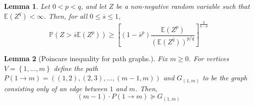 \documentclass{article}
\newcommand{\set}[1]{\left\{#1\right\}}
\newcommand{\1}{\mathbf{1}}
\theoremstyle{alden}
\theoremstyle{aldenthm}
\newtheorem{lemma}{Lemma}
\theoremstyle{definition}
\theoremstyle{remark}
\begin{document}
\begin{lemma}
	\label{lem:paley_zygmund}
	Let $0 < p < q$, and let $Z$ be a non-negative random variable such that $\mathbb{E}(Z^q) < \infty$. Then, for all $0 \leq \overline{s} \leq 1$,
	\begin{equation}
	\label{eqn:paley_zygmund}
	\mathbb{P}(Z > \overline{s} \mathbb{E}(Z^p)) \geq \left[(1 - \overline{s}^p) \frac{\mathbb{E}(Z^p)}{(\mathbb{E}(Z^q))^{p/q}}\right]^{\frac{q}{q - p}}
	\end{equation}
\end{lemma}

\begin{lemma}[Poincare inequality for path graphs.]
	\label{lem: path_poincare}
	Fix $m \geq 0$. For vertices $V = \set{1, \ldots,m}$ define the path $P(1 \to m) = ((1,2),(2,3),\ldots, (m-1,m))$ and $G_{(1,m)}$ to be the graph consisting only of an edge between $1$ and $m$. Then,
	\begin{equation*}
	(m - 1) \cdot P(1 \to m) \succeq G_{(1,m)}
	\end{equation*}
\end{lemma}
\end{document}
